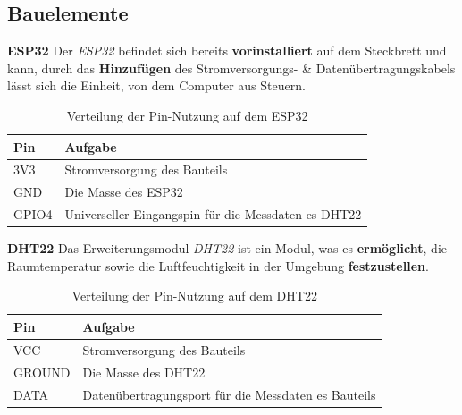 \documentclass[9pt,a4paper]{report}
\begin{document}
	\subsection{Bauelemente}
	
	\textbf{ESP32}
	\newline
	Der \textit{ESP32} befindet sich bereits \textbf{vorinstalliert} auf dem Steckbrett und kann, durch das \textbf{Hinzufügen} des Stromversorgungs- \& Datenübertragungskabels lässt sich die Einheit, von dem Computer aus Steuern.
	\renewcommand{\arraystretch}{1.5}
	\begin{table}[h!] %
		\centering %
		\caption{Verteilung der Pin-Nutzung auf dem ESP32} %
		\label{tab:teil_1_steckbrett_esp32} %
		\begin{tabular}{|l|l|} %
			\hline
			Pin & Aufgabe \\
			\hline
			3V3 & Stromversorgung des Bauteils \\
			GND & Die Masse des ESP32 \\
			GPIO4 & Universeller Eingangspin für die Messdaten es DHT22 \\
			\hline %
		\end{tabular}
	\end{table}
	\renewcommand{\arraystretch}{1}
	\newline
	\newpage
	\textbf{DHT22}
	\newline
	Das Erweiterungsmodul \textit{DHT22} ist ein Modul, was es \textbf{ermöglicht}, die Raumtemperatur sowie die Luftfeuchtigkeit in der Umgebung \textbf{festzustellen}.
	\renewcommand{\arraystretch}{1.5}
	\begin{table}[h!] %
		\centering %
		\caption{Verteilung der Pin-Nutzung auf dem DHT22} %
		\label{tab:teil_1_steckbrett_dht22} %
		\begin{tabular}{|l|l|} %
			\hline
			Pin & Aufgabe \\
			\hline
			VCC & Stromversorgung des Bauteils \\
			GROUND & Die Masse des DHT22 \\
			DATA & Datenübertragungsport für die Messdaten es Bauteils \\
			\hline %
		\end{tabular}
	\end{table}
	\renewcommand{\arraystretch}{1}
	
\end{document}
